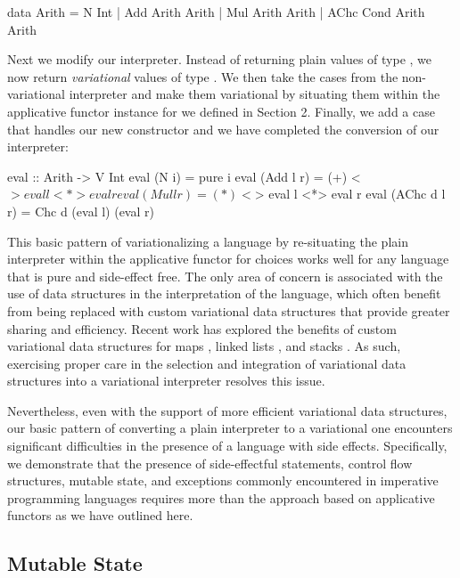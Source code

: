 \documentclass[letterpaper,10pt,onecolumn]{article}
\begin{document}
\begin{program}
data Arith = N Int | Add Arith Arith | Mul Arith Arith | AChc Cond Arith Arith
\end{program}

Next we modify our interpreter. Instead of returning plain values of type ,
we now return \emph{variational} values of type . We then take the cases
from the non-variational interpreter and make them variational by situating them within the
applicative functor instance for  we defined in Section 2. Finally, we add a case
that handles our new  constructor and we have completed the conversion of our
interpreter:

\begin{program}
eval :: Arith -> V Int
eval (N i) = pure i
eval (Add l r) = (+) <$> eval l <*> eval r
eval (Mul l r) = (*) <$> eval l <*> eval r
eval (AChc d l r) = Chc d (eval l) (eval r)
\end{program}

This basic pattern of variationalizing a language by re-situating the
plain interpreter within the applicative functor for choices works well for any language that is pure
and side-effect free. The only area of concern is associated with the use of data structures in the
interpretation of the language, which often benefit from being replaced with custom variational data structures that
provide greater sharing and efficiency. Recent work has explored the benefits of custom variational
data structures for maps \cite{walkingshaw2014variational}, linked lists \cite{lists}, and stacks \cite{stacks}.
As such, exercising proper care in the selection and integration of variational data structures
into a variational interpreter resolves this issue.

Nevertheless, even with the support of more efficient
variational data structures, our basic pattern of converting a plain interpreter to a variational one
encounters significant difficulties in the presence of a language with side effects. Specifically, we
demonstrate that the presence of side-effectful statements, control flow structures, mutable state, and exceptions
commonly encountered in imperative programming languages requires more than the approach based
on applicative functors as we have outlined here.

\subsection{Mutable State}
\end{document}
